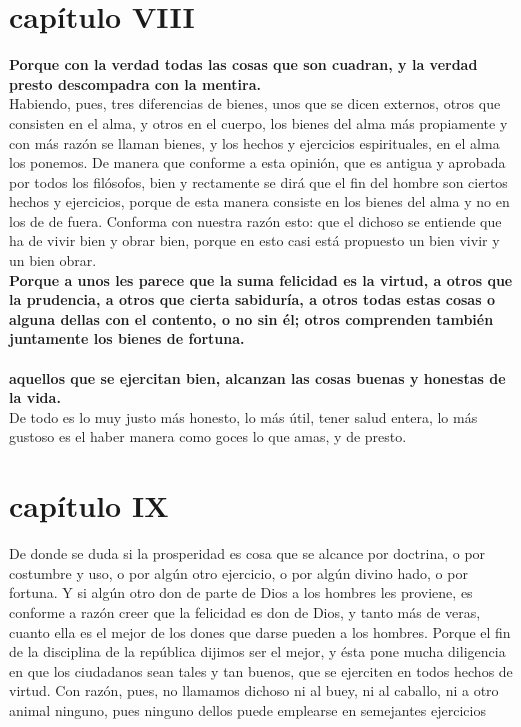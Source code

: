 \begin{multicols}{2}
\section*{capítulo VIII}
\textbf{Porque con la verdad todas las cosas que son cuadran, y la verdad presto descompadra con la mentira.}\\
Habiendo, pues, tres diferencias de bienes, unos que se dicen externos, otros que consisten en el alma, y otros en el cuerpo, los bienes del alma más propiamente y con más razón se llaman bienes, y los hechos y ejercicios espirituales, en el alma los ponemos. De manera que conforme a esta opinión, que es antigua y aprobada por todos los filósofos, bien y rectamente se dirá que el fin del hombre son ciertos hechos y ejercicios, porque de esta manera consiste en los bienes del alma y no en los de de fuera. Conforma con nuestra razón esto: que el dichoso se entiende que ha de vivir bien y obrar bien, porque en esto casi está propuesto un bien vivir y un bien obrar.\\
\textbf{Porque a unos les parece que la suma felicidad es la virtud, a otros que la prudencia, a otros que cierta sabiduría, a otros todas estas cosas o alguna dellas con el contento, o no sin él; otros comprenden también juntamente los bienes de fortuna.}\\\\
\textbf{aquellos que se ejercitan bien, alcanzan las cosas buenas y honestas de la vida.}\\
De todo es lo muy justo más honesto, lo más útil, tener salud entera, lo más gustoso es el haber manera como goces lo que amas, y de presto.

\section*{capítulo IX}
De donde se duda si la prosperidad es cosa que se alcance por doctrina, o por costumbre y uso, o por algún otro ejercicio, o por algún divino hado, o por fortuna. Y si algún otro don de parte de Dios a los hombres les proviene, es conforme a razón creer que la felicidad es don de Dios, y tanto más de veras, cuanto ella es el mejor de los dones que darse pueden a los hombres.
Porque el fin de la disciplina de la república dijimos ser el mejor, y ésta pone mucha diligencia en que los ciudadanos sean tales y tan buenos, que se ejerciten en todos hechos de virtud. Con razón,
pues, no llamamos dichoso ni al buey, ni al caballo, ni a otro animal ninguno, pues ninguno dellos puede emplearse en semejantes ejercicios\\


\end{multicols}
